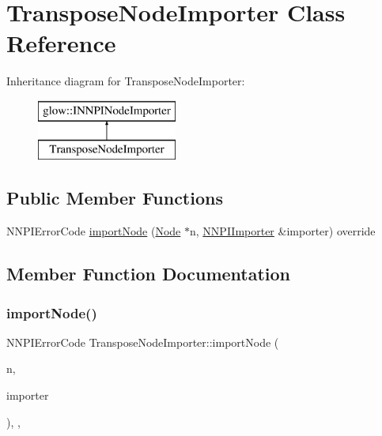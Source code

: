 \hypertarget{class_transpose_node_importer}{}\section{Transpose\+Node\+Importer Class Reference}
\label{class_transpose_node_importer}
Inheritance diagram for Transpose\+Node\+Importer\+:\begin{figure}[H]
\begin{center}
\leavevmode
\includegraphics[height=2.000000cm]{class_transpose_node_importer}
\end{center}
\end{figure}
\subsection*{Public Member Functions}
\begin{DoxyCompactItemize}
\item 
N\+N\+P\+I\+Error\+Code \hyperlink{class_transpose_node_importer_a86f4ae6773a3898950e9e70d415aa861}{import\+Node} (\hyperlink{classglow_1_1_node}{Node} $\ast$n, \hyperlink{classglow_1_1_n_n_p_i_importer}{N\+N\+P\+I\+Importer} \&importer) override
\end{DoxyCompactItemize}


\subsection{Member Function Documentation}
\mbox{\label{class_transpose_node_importer_a86f4ae6773a3898950e9e70d415aa861}} 
\subsubsection{\texorpdfstring{import\+Node()}{importNode()}}
{\footnotesize\ttfamily N\+N\+P\+I\+Error\+Code Transpose\+Node\+Importer\+::import\+Node (\begin{DoxyParamCaption}\item[{\hyperlink{classglow_1_1_node}{Node} $\ast$}]{n,  }\item[{\hyperlink{classglow_1_1_n_n_p_i_importer}{N\+N\+P\+I\+Importer} \&}]{importer }\end{DoxyParamCaption})\hspace{0.3cm}{\ttfamily [inline]}, {\ttfamily [override]}, {\ttfamily [virtual]}}

